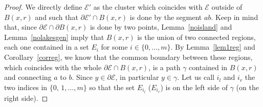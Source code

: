 \documentclass[JEP,XML,SOM,Unicode,NoFloatCountersInSection]{cedram}
\newcommand\E{\mathcal{E}}
\theoremstyle{plain}
\theoremstyle{definition}
\begin{document}
\begin{proof}
We directly define $\E'$ as the cluster which coincides with $\E$ outside of $B(x,r)$ and such that $\partial\E'\cap B(x,r)$ is done by the segment $ab$. Keep in mind that, since $\partial\E\cap \partial B(x,r)$ is done by two points, Lemma~\ref{noisland} and Lemma~\ref{nolakesgen} imply that $B(x,r)$ is the union of two connected regions, each one contained in a set $E_i$ for some $i\in\{0,\dots,m\}$. By Lemma~\ref{lem1reg} and Corollary~\ref{correg}, we know that the common boundary between these regions, which coincides with the whole $\partial\E\cap B(x,r)$, is a path $\gamma$ contained in $B(x,r)$ and connecting $a$ to $b$. Since $y\in\partial\E$, in particular $y\in\gamma$. Let us call $i_l$ and $i_r$ the two indices in $\{0,\, 1 ,\dots, m\}$ so that the set $E_{i_l}$ (\resp $E_{i_r}$) is on the left side of $\gamma$ (\resp on the right side).


\end{proof}
\end{document}
